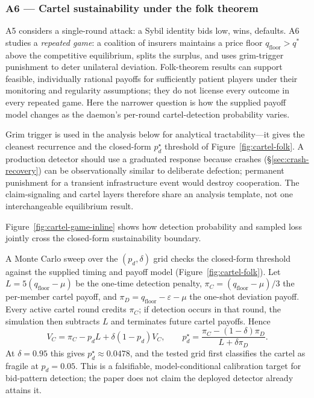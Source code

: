 \documentclass[11pt,a4paper]{article}
\theoremstyle{definition}
\theoremstyle{remark}
\begin{document}
\subsubsection{A6 --- Cartel sustainability under the folk theorem}\label{sec:youle:a6}

A5 considers a single-round attack: a Sybil identity bids low, wins, defaults. A6 studies a \emph{repeated game}: a coalition of insurers maintains a price floor $q_{\mathrm{floor}} > q^*$ above the competitive equilibrium, splits the surplus, and uses grim-trigger punishment to deter unilateral deviation. Folk-theorem results can support feasible, individually rational payoffs for sufficiently patient players under their monitoring and regularity assumptions; they do not license every outcome in every repeated game. Here the narrower question is how the supplied payoff model changes as the daemon's per-round cartel-detection probability varies.

Grim trigger is used in the analysis below for analytical tractability---it gives the cleanest recurrence and the closed-form $p_d^\star$ threshold of Figure~\ref{fig:cartel-folk}. A production detector should use a graduated response because crashes (\S\ref{sec:crash-recovery}) can be observationally similar to deliberate defection; permanent punishment for a transient infrastructure event would destroy cooperation. The claim-signaling and cartel layers therefore share an analysis template, not one interchangeable equilibrium result.

Figure~\ref{fig:cartel-game-inline} shows how detection probability and sampled
loss jointly cross the closed-form sustainability boundary.



A Monte Carlo sweep over the $(p_d, \delta)$ grid checks the closed-form threshold against the supplied timing and payoff model (Figure~\ref{fig:cartel-folk}). Let $L=5(q_{\mathrm{floor}}-\mu)$ be the one-time detection penalty, $\pi_C=(q_{\mathrm{floor}}-\mu)/3$ the per-member cartel payoff, and $\pi_D=q_{\mathrm{floor}}-\varepsilon-\mu$ the one-shot deviation payoff. Every active cartel round credits $\pi_C$; if detection occurs in that round, the simulation then subtracts $L$ and terminates future cartel payoffs. Hence
\[
V_C=\pi_C-p_dL+\delta(1-p_d)V_C,
\qquad
p_d^\star=\frac{\pi_C-(1-\delta)\pi_D}{L+\delta\pi_D}.
\]
At $\delta=0.95$ this gives $p_d^\star\approx0.0478$, and the tested grid first classifies the cartel as fragile at $p_d=0.05$. This is a falsifiable, model-conditional calibration target for bid-pattern detection; the paper does not claim the deployed detector already attains it.
\end{document}
